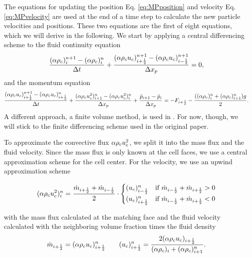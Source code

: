 The equations for updating the position Eq. \eqref{eq:MPposition} and velocity Eq. \eqref{eq:MPvelocity} are used at the end of a time step to calculate the new particle velocities and positions.
These two equations are the first of eight equations, which we will derive in the following.
We start by applying a central differencing scheme to the fluid continuity equation
\begin{equation}
    \label{eq:gasContDisc}
    \dfrac{(\alpha \rho_c)_i^{n+1} - (\alpha \rho_c)_i^n}{\Delta t} + \dfrac{(\alpha \rho_c u_c)_{i+\frac{1}{2}}^{n+1}- (\alpha \rho_c u_c)_{i-\frac{1}{2}}^{n+1}}{\Delta x_p} = 0,
\end{equation}
and the momentum equation
\begin{equation}
    \label{eq:discMom}
    \dfrac{(\alpha \rho_c u_c)_{i+\frac{1}{2}}^{n+1}- (\alpha \rho_c u_c)_{i+\frac{1}{2}}^{n}}{\Delta t} + \dfrac{(\alpha \rho_c u_c^2)^n_{i+1}-(\alpha \rho_c u_c^2)^n_{i}}{\Delta x_p} + \dfrac{\tilde{p}_{i+1}-\tilde{p}_i}{\Delta x_p} = - F_{i+\frac{1}{2}}-\dfrac{((\alpha \rho_c)_i^n + (\alpha \rho_c)_{i+1}^n)g}{2}.
\end{equation}
A different approach, a finite volume method, is used in \OFns. For now, though, we will stick to the finite differencing scheme used in the original paper.

To approximate the convective flux $\alpha \rho_c u_c^2$, we split it into the mass flux and the fluid velocity.
Since the mass flux is only known at the cell faces, we use a central approximation scheme for the cell center. 
For the velocity, we use an upwind approximation scheme

\begin{align}
    (\alpha \rho_c u_c^2)_i^n = \dfrac{\dot{m}_{i+\frac{1}{2}}+\dot{m}_{i-\frac{1}{2}}}{2} \cdot
    \begin{cases}
        (u_c)^n_{i- \frac{1}{2}} & \text{if } \dot{m}_{i-\frac{1}{2}} + \dot{m}_{i+\frac{1}{2}} > 0 \\
        (u_c)^n_{i+ \frac{1}{2}} & \text{if } \dot{m}_{i-\frac{1}{2}} + \dot{m}_{i+\frac{1}{2}} < 0
    \end{cases}
\end{align}

with the mass flux calculated at the matching face and the fluid velocity calculated with the neighboring volume fraction times the fluid density
\begin{align}
    \dot{m}_{i+\frac{1}{2}} = (\alpha \rho_c u_c)^n_{i+\frac{1}{2}} \qquad (u_c)_{i+\frac{1}{2}}^n = \dfrac{2 (\alpha \rho_c u_c)_{i+\frac{1}{2}}}{(\alpha \rho_c)_{i} + (\alpha \rho_c)_{i+1}^n}.
\end{align}


